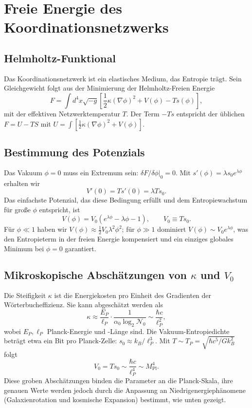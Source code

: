 \documentclass[12pt,a4paper]{article}
\begin{document}
	\section{Freie Energie des Koordinationsnetzwerks}
	
	\subsection{Helmholtz-Funktional}
	Das Koordinationsnetzwerk ist ein elastisches Medium, das Entropie trägt. Sein Gleichgewicht folgt aus der Minimierung der Helmholtz-Freien Energie
	\begin{equation}
		F = \int d^4x \sqrt{-g} \left[ \frac{1}{2}\kappa (\nabla\phi)^2 + V(\phi) - T s(\phi) \right],
		\label{eq:F}
	\end{equation}
	mit der effektiven Netzwerktemperatur \(T\). Der Term \(-Ts\) entspricht der üblichen \(F = U - TS\) mit \(U = \int [\frac12\kappa(\nabla\phi)^2 + V(\phi)]\).
	
	\subsection{Bestimmung des Potenzials}
	Das Vakuum \(\phi=0\) muss ein Extremum sein: \(\delta F/\delta\phi|_0 = 0\). Mit \(s'(\phi) = \lambda s_0 e^{\lambda\phi}\) erhalten wir
	\[
	V'(0) = T s'(0) = \lambda T s_0.
	\]
	Das einfachste Potenzial, das diese Bedingung erfüllt und dem Entropiewachstum für große \(\phi\) entspricht, ist
	\begin{equation}
		\boxed{V(\phi) = V_0 \left( e^{\lambda\phi} - \lambda\phi - 1 \right), \qquad V_0 \equiv T s_0.}
		\label{eq:V}
	\end{equation}
	Für \(\phi \ll 1\) haben wir \(V(\phi) \approx \frac12 V_0 \lambda^2 \phi^2\); für \(\phi \gg 1\) dominiert \(V(\phi) \sim V_0 e^{\lambda\phi}\), was den Entropieterm in der freien Energie kompensiert und ein einziges globales Minimum bei \(\phi=0\) garantiert.
	
	\subsection{Mikroskopische Abschätzungen von \(\kappa\) und \(V_0\)}
	Die Steifigkeit \(\kappa\) ist die Energiekosten pro Einheit des Gradienten der Wörterbucheffizienz. Sie kann abgeschätzt werden als
	\[
	\kappa \approx \frac{E_P}{\ell_P} \cdot \frac{1}{\alpha_0 \log_2 \mathcal{N}_0} \sim \frac{\hbar c}{\ell_P^2},
	\]
	wobei \(E_P, \ell_P\) Planck-Energie und -Länge sind. Die Vakuum-Entropiedichte beträgt etwa ein Bit pro Planck-Zelle: \(s_0 \approx k_B / \ell_P^3\). Mit \(T \sim T_P = \sqrt{\hbar c^5 / G k_B^2}\) folgt
	\[
	V_0 = T s_0 \sim \frac{\hbar c}{\ell_P^4} \sim M_{\mathrm{Pl}}^4.
	\]
	Diese groben Abschätzungen binden die Parameter an die Planck-Skala, ihre genauen Werte werden jedoch durch die Anpassung an Niedrigenergiephänomene (Galaxienrotation und kosmische Expansion) bestimmt, wie unten gezeigt.
	
\end{document}
